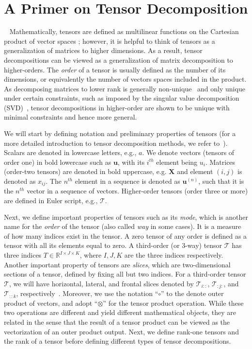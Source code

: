 \section{A Primer on Tensor Decomposition}~\label{sec:td_def}
Mathematically, tensors are defined as multilinear functions on the Cartesian product of vector spaces \cite{spivak2018calculus}; however, it is helpful to think of tensors as a generalization of matrices to higher dimensions. As a result, tensor decompositions can be viewed as a generalization of matrix decomposition to higher-orders. The \textit{order} of a tensor is usually defined as the number of its dimensions, or equivalently the number of vectors spaces included in the product. As decomposing matrices to lower rank is generally non-unique~\cite{rabanser2017introduction} and only unique under certain constraints, such as imposed by the singular value decomposition (SVD)~\cite{kolda2009tensor}, tensor decompositions in higher-order are shown to be unique with minimal constraints and hence more general.

We will start by defining notation and preliminary properties of tensors (for a more detailed introduction to tensor decomposition methods, we refer to~\cite{kolda2009tensor}). Scalars are denoted in lowercase letters, e.g., $a$. We denote vectors (tensors of order one) in bold lowercase such as $\mathbf{u}$, with its $i^{th}$ element being $u_i$. Matrices (order-two tensors) are denoted in bold uppercase, e.g. $\mathbf{X}$ and element $(i,j)$ is denoted as $x_{ij}$. The $n^{th}$ element in a sequence is denoted as $\textbf{u}^{(n)}$, such that it is the $n^{th}$ vector in a sequence of vectors. Higher-order tensors (order three or more) are defined in Euler script, e.g., $\mathcal{T}$. 

Next, we define important properties of tensors such as its \textit{mode}, which is another name for the \textit{order} of the tensor (also called \textit{way} in some cases).  It is a measure of how many indices exist in the tensor. A zero tensor of any order is defined as a tensor with all its elements equal to zero. A third-order (or 3-way) tensor $\mathcal{T}$ has three indices $T \in \mathbb{R}^{I\times J\times K}$, where $I,J,K$ are the three indices respectively. 
Another important property of tensors are \textit{slices}, which are two-dimensional sections of a tensor, defined by fixing all but two indices. For a third-order tensor $\mathcal{T}$, we will have horizontal, lateral, and frontal slices denoted by $\mathcal{T}_{i::}$, $\mathcal{T}_{:j:}$, and $\mathcal{T}_{::k}$, respectively~\cite{kolda2009tensor}. Moreover, we use the notation ``$\circ$'' to the denote outer product of vectors, and adopt ``$\otimes$'' for the tensor product operation. While these two operations are different and yield different mathematical objects, they are related in the sense that the result of a tensor product can be viewed as the vectorization of an outer product output. Next, we define rank-one tensors and the rank of a tensor before defining different types of tensor decompositions. 

